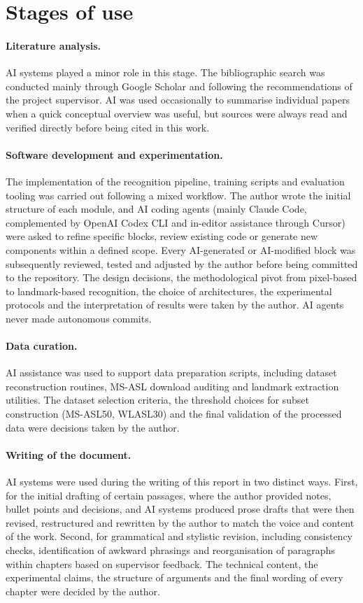 \section*{Stages of use}

\paragraph{Literature analysis.} AI systems played a minor role in this stage. The bibliographic search was conducted mainly through
Google Scholar and following the recommendations of the project supervisor. AI was used
occasionally to summarise individual papers when a quick conceptual overview was useful, but
sources were always read and verified directly before being cited in this work.

\paragraph{Software development and experimentation.} The implementation of the recognition pipeline, training scripts and evaluation tooling was carried
out following a mixed workflow. The author wrote the initial structure of each module, and AI
coding agents (mainly Claude Code, complemented by OpenAI Codex CLI and in-editor assistance
through Cursor) were asked to refine specific blocks, review existing code or generate new
components within a defined scope. Every AI-generated or AI-modified block was subsequently
reviewed, tested and adjusted by the author before being committed to the repository. The design
decisions, the methodological pivot from pixel-based to landmark-based recognition, the choice of
architectures, the experimental protocols and the interpretation of results were taken by the
author. AI agents never made autonomous commits.

\paragraph{Data curation.} AI assistance was used to support data preparation scripts, including dataset reconstruction
routines, MS-ASL download auditing and landmark extraction utilities. The dataset selection
criteria, the threshold choices for subset construction (MS-ASL50, WLASL30) and the final
validation of the processed data were decisions taken by the author.

\paragraph{Writing of the document.} AI systems were used during the writing of this report in two distinct ways. First, for the initial
drafting of certain passages, where the author provided notes, bullet points and decisions, and AI
systems produced prose drafts that were then revised, restructured and rewritten by the author to
match the voice and content of the work. Second, for grammatical and stylistic revision, including
consistency checks, identification of awkward phrasings and reorganisation of paragraphs within
chapters based on supervisor feedback. The technical content, the experimental claims, the
structure of arguments and the final wording of every chapter were decided by the author.

